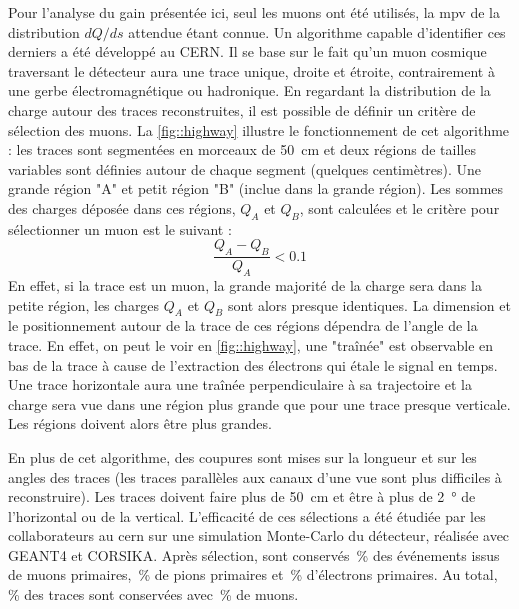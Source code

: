         Pour l'analyse du gain présentée ici, seul les muons ont été utilisés, la \gls{mpv} de la distribution $dQ/ds$ attendue étant connue. Un algorithme capable d'identifier ces derniers a été développé au CERN. Il se base sur le fait qu'un muon cosmique traversant le détecteur aura une trace unique, droite et étroite, contrairement à une gerbe électromagnétique ou hadronique. En regardant la distribution de la charge autour des traces reconstruites, il est possible de définir un critère de sélection des muons. La \autoref{fig::highway} illustre le fonctionnement de cet algorithme : les traces sont segmentées en morceaux de \SI{50}{\centi\meter} et deux régions de tailles variables sont définies autour de chaque segment (quelques centimètres). Une grande région "A" et petit région "B" (inclue dans la grande région). Les sommes des charges déposée dans ces régions, $Q_A$ et $Q_B$, sont calculées et le critère pour sélectionner un muon est le suivant :
        \begin{equation}\label{eq::cbr}
          \frac{Q_A-Q_B}{Q_A} < 0.1
        \end{equation}
        En effet, si la trace est un muon, la grande majorité de la charge sera dans la petite région, les charges $Q_A$ et $Q_B$ sont alors presque identiques. La dimension et le positionnement autour de la trace de ces régions dépendra de l'angle de la trace. En effet, on peut le voir en \autoref{fig::highway}, une "traînée" est observable en bas de la trace à cause de l'extraction des électrons qui étale le signal en temps. Une trace horizontale aura une traînée perpendiculaire à sa trajectoire et la charge sera vue dans une région plus grande que pour une trace presque verticale. Les régions doivent alors être plus grandes.

        En plus de cet algorithme, des coupures sont mises sur la longueur et sur les angles des traces (les traces parallèles aux canaux d'une vue sont plus difficiles à reconstruire). Les traces doivent faire plus de \SI{50}{\centi\meter} et être à plus de \SI{2}{\degree} de l'horizontal ou de la vertical. L'efficacité de ces sélections a été étudiée par les collaborateurs au \gls{cern} sur une simulation Monte-Carlo du détecteur, réalisée avec GEANT4 et CORSIKA. Après sélection, sont conservés \,\% des événements issus de muons primaires, \,\% de pions primaires et \,\% d'électrons primaires. Au total, \,\% des traces sont conservées avec \,\% de muons.

